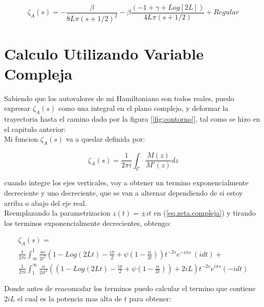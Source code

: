 \begin{equation}
    \zeta _A (s) = -\frac{\beta}{8 L \pi (s+1/2)^2} -
    \beta \frac{(-1 + \gamma + Log[2L ])}{4 L \pi (s+1/2)} + 
    Regular
\end{equation}

\section{Calculo Utilizando Variable Compleja}


Sabiendo que los autovalores de mi Hamiltoniano son todos reales, puedo expresar $\zeta _A (s)$ como una integral en el plano complejo, y deformar la trayectoria hasta el camino dado por la figura [\ref{fig:contorno}], tal como se hizo en el capitulo anterior: \\

Mi funcion $ \zeta _A (s) $ va a quedar definida por:

\begin{equation}
\zeta _A (s) = 
\frac{1}{2 \pi i} 
\int _{\mathcal{C}}
\frac{M (z) }{ M' (z) } dz
\label{eq.zeta.compleja}
\end{equation}


cuando integre los ejes verticales, voy a obtener un termino exponencialmente decreciente y uno decreciente, que se van a alternar dependiendo de si estoy arriba o abajo del eje real. \\

Reemplazando la parametrizacion $z(t) = \pm i t$ en (\ref{eq.zeta.compleja}) y tirando los terminos exponencialmente decrecientes, obtengo:

\begin{equation}
\begin{array}{c}
    \zeta _A (s) = \\
     \frac{1}{2 \pi i} \int _{\infty} ^{1}
     \frac{i \alpha}{2 t^2}
     \left(
     1 - Log(2 L t) - \frac{i \pi}{2} + \psi (1-\frac{\alpha}{2 t})
     \right)
     t^{-2 s}
     e^{-i \pi s} \ 
     (i dt) + \\
     \frac{1}{2 \pi i} \int _1 ^{\infty}
     \frac{ \alpha}{2 i t^2}
     \left(
     \left(
     1 - Log(2 L t) - \frac{i \pi}{2} + \psi (1-\frac{\alpha}{2 t}) 
     \right)
     + 2 i L
     \right)
     t^{-2 s}
     e^{i \pi s}
     (-i dt)
     
\end{array}
\end{equation}

Donde antes de reacomodar los terminos puedo calcular el termino que contiene $2iL$ el cual es la potencia mas alta de $t$ para obtener: 

